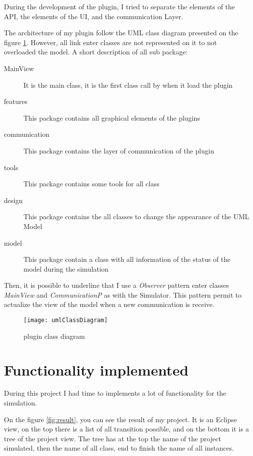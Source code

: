 During the development of the plugin, I tried to separate the elements of the \umld API, the elements of the UI, and the communication Layer.

The architecture of my plugin follow the UML class diagram presented on the figure \ref{fig:classDiagram}. However, all link enter classes are not represented on it to not overloaded the model. A short description of all sub package:

\noitemsep
\begin{description}
\item[MainView] It is the main class, it is the first class call by \umld when it load the plugin
\item[features] This package contains all graphical elements of the plugins
\item[communication] This package contains the layer of communication of the plugin
\item[tools] This package contains some tools for all class
\item[design] This package contains the all classes to change the appearance of the UML Model
\item[model] This package contain a class with all information of the status of the model during the simulation
\end{description}
\doitemsep

Then, it is possible to underline that I use a \textit{Observer} pattern enter classes \textit{MainView} and \textit{CommunicationP} as with the Simulator. This pattern permit to actualize the view of the model when a new communication is receive.

\begin{figure}[h]
  \centering
  \texttt{[image: umlClassDiagram]}
  \caption{plugin class diagram}
  \label{fig:classDiagram}
\end{figure}



\section{Functionality implemented}

During this project I had time to implements a lot of functionality for the simulation.


On the figure \ref{fig:result}, you can see the result of my project. It is an Eclipse view, on the top there is a list of all transition possible, and on the bottom it is a tree of the project view. The tree has at the top the name of the project simulated, then the name of all class, end to finish the name of all instances.

